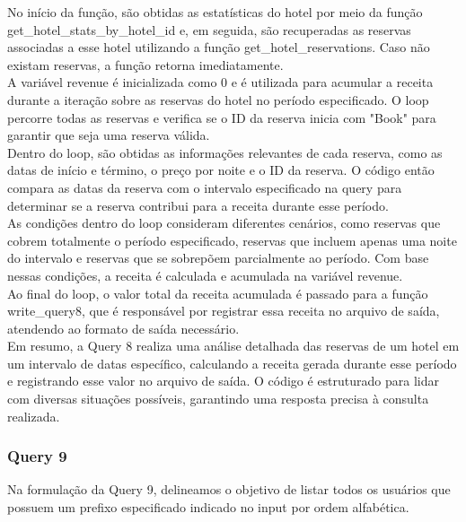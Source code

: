 \documentclass[12pt,a4paper]{article}
\begin{document}
    No início da função, são obtidas as estatísticas do hotel por meio da função get\_hotel\_stats\_by\_hotel\_id e, em seguida, são recuperadas as reservas associadas a esse hotel utilizando a função get\_hotel\_reservations. Caso não existam reservas, a função retorna imediatamente.\\

    A variável revenue é inicializada como 0 e é utilizada para acumular a receita durante a iteração sobre as reservas do hotel no período especificado. O loop percorre todas as reservas e verifica se o ID da reserva inicia com "Book" para garantir que seja uma reserva válida.\\

    Dentro do loop, são obtidas as informações relevantes de cada reserva, como as datas de início e término, o preço por noite e o ID da reserva. O código então compara as datas da reserva com o intervalo especificado na query para determinar se a reserva contribui para a receita durante esse período.\\

    As condições dentro do loop consideram diferentes cenários, como reservas que cobrem totalmente o período especificado, reservas que incluem apenas uma noite do intervalo e reservas que se sobrepõem parcialmente ao período. Com base nessas condições, a receita é calculada e acumulada na variável revenue.\\

    Ao final do loop, o valor total da receita acumulada é passado para a função write\_query8, que é responsável por registrar essa receita no arquivo de saída, atendendo ao formato de saída necessário.\\

    Em resumo, a Query 8 realiza uma análise detalhada das reservas de um hotel em um intervalo de datas específico, calculando a receita gerada durante esse período e registrando esse valor no arquivo de saída. O código é estruturado para lidar com diversas situações possíveis, garantindo uma resposta precisa à consulta realizada.

    \subsubsection{Query 9}
    \hspace{0.6cm}Na formulação da Query 9, delineamos o objetivo de listar todos os usuários que possuem um prefixo especificado indicado no input por ordem alfabética.\\
     
\end{document}
